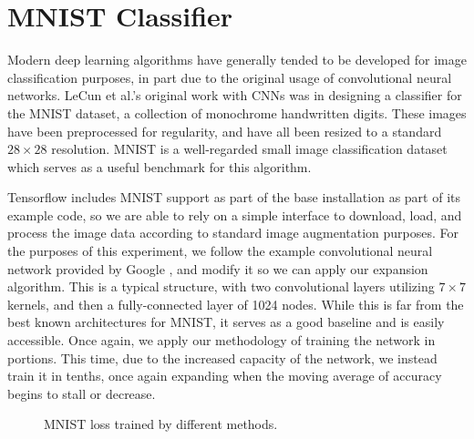 \section{MNIST Classifier}
Modern deep learning algorithms have generally tended to be developed for image classification purposes, in part due to the original usage of convolutional neural networks.
LeCun et al.'s original work with CNNs \cite{lecun1998gradient} was in designing a classifier for the MNIST dataset, a collection of monochrome handwritten digits.
These images have been preprocessed for regularity, and have all been resized to a standard $28\times 28$ resolution.
MNIST is a well-regarded small image classification dataset which serves as a useful benchmark for this algorithm.


Tensorflow includes MNIST support as part of the base installation as part of its example code, so we are able to rely on a simple interface to download, load, and process the image data according to standard image augmentation purposes.
For the purposes of this experiment, we follow the example convolutional neural network provided by Google \cite{deepmnist}, and modify it so we can apply our expansion algorithm.
This is a typical structure, with two convolutional layers utilizing $7\times 7$ kernels, and then a fully-connected layer of 1024 nodes.
While this is far from the best known architectures for MNIST, it serves as a good baseline and is easily accessible.
Once again, we apply our methodology of training the network in portions.
This time, due to the increased capacity of the network, we instead train it in tenths, once again expanding when the moving average of accuracy begins to stall or decrease.

\begin{figure}[!htb]
\centering
\resizebox{0.8\textwidth}{!}{}
\caption{MNIST loss trained by different methods.}
\label{fig:mnist_loss}
\end{figure}

